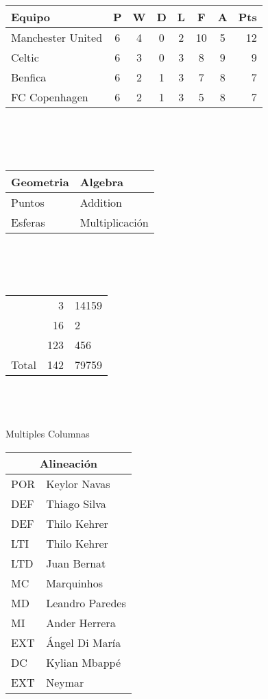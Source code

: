 \documentclass{article}
\begin{document}
\\ \\ \\
\begin{tabular}{l*{6}{c}r}
    Equipo              & P & W & D & L & F  & A & Pts \\
\hline
Manchester United & 6 & 4 & 0 & 2 & 10 & 5 & 12  \\
Celtic            & 6 & 3 & 0 & 3 &  8 & 9 &  9  \\
Benfica           & 6 & 2 & 1 & 3 &  7 & 8 &  7  \\
FC Copenhagen     & 6 & 2 & 1 & 3 &  5 & 8 &  7  \\
\end{tabular}
\\ \\ \\ 
\begin{tabular}{>{\centering}p{3.5cm}>{\centering}p{3.5cm} }
    Geometria & Algebra
    \tabularnewline
    \hline
     Puntos & Addition 
    \tabularnewline
     Esferas & Multiplicación
\end{tabular}
\\ \\ \\
\begin{tabular}{r|r@{.}l}
            &3      & 14159 \\
            &16     & 2     \\
            &123    & 456   \\ \hline 
    Total   &142    &79759  \\
\end{tabular}
\\ \\ \\

Multiples Columnas\\
\begin{tabular}{|l|l|}
    \hline
    \multicolumn{2}{|c|}{Alineación}\\
    \hline
    POR &  Keylor Navas\\ \hline
    DEF &  Thiago Silva\\
    DEF &  Thilo Kehrer \\
    LTI & Thilo Kehrer\\
    LTD &  Juan Bernat	\\ \hline
    MC &  Marquinhos\\ 
    MD &  Leandro Paredes\\
    MI &  Ander Herrera\\ \hline
    EXT &  Ángel Di María\\
    DC &  Kylian Mbappé\\
    EXT &  Neymar\\ \hline
\end{tabular}
\\ \\ \\
\end{document}
